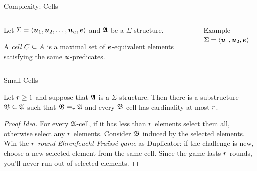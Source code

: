 \documentclass{beamer}
\begin{document}
\begin{frame}{Complexity: Cells}
\begin{columns}[T]
\begin{column}{0.42\textwidth}
Let $\Sigma = \left\langle \bm{u}_{1},\bm{u}_{2},\dots,\bm{u}_{u},\bm{e} \right\rangle$ and $\mathfrak{A}$ be a
$\Sigma$-structure.

A \emph{cell} $C\subseteq A$ is a maximal set of $\bm{e}$-equivalent elements
satisfying the same $\bm{u}$-predicates.
\end{column}%
\begin{column}{0.6\textwidth}
Example $\Sigma = \left\langle \bm{u}_{1},\bm{u}_{2},\bm{e} \right\rangle$

\end{column}%
\end{columns}
\end{frame}

\begin{frame}{Small Cells}
\begin{lemma}
Let $r \geq 1$ and suppose that $\mathfrak{A}$ is a $\Sigma$-structure.
Then there is a substructure $\mathfrak{B}\subseteq\mathfrak{A}$ such that
$\mathfrak{B}\equiv_{r}\mathfrak{A}$ and every $\mathfrak{B}$-cell has cardinality at most $r$.
\end{lemma}
\begin{proof}[Proof Idea]
For every $\mathfrak{A}$-cell, if it has less than $r$ elements select them all,
otherwise select any $r$ elements. Consider $\mathfrak{B}$ induced by the selected
elements.
Win the \emph{$r$-round Ehrenfeucht-Fra\"{i}ss\'{e} game} as Duplicator:
if the challenge is new, choose a new selected element from the same cell.
Since the game lasts $r$ rounds, you'll never run out of selected elements.
\end{proof}
\end{frame}
\end{document}
